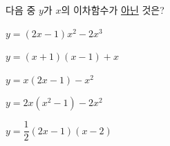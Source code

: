 다음 중 $y$가 $x$의 이차함수가 \underline{아닌} 것은?
\begin{choicesii}{\rule[-3ex]{0pt}{8ex}$y=(2x-1)x^2-2x^3$}{\rule[-3ex]{0pt}{8ex}$y=(x+1)(x-1)+x$}{\rule[-3ex]{0pt}{8ex}$y=x(2x-1)-x^2$}{\rule[-3ex]{0pt}{8ex}$y=2x(x^2-1)-2x^2$}{\rule[-3ex]{0pt}{8ex}$y=\dfrac{1}{2}(2x-1)(x-2)$}\end{choicesii}
